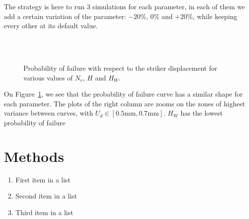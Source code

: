 \documentclass[
10pt, %
a4paper, %
oneside, %
headinclude,footinclude, %
BCOR5mm, %
]{scrartcl}
\begin{document}
The strategy is here to run $3$ simulations for each parameter,
in each of them we add a certain variation of the parameter: $-20\%$, $0\%$ and $+20\%$,
while keeping every other at its default value.

\begin{figure}[H]
    \centering
    \hfill
    \\
    \hfill
    \\
    \hfill

    \caption{Probability of failure with respect to the striker displacement for
        various values of $N_r$, $H$ and $H_W$.}
    \label{fig:param-var}
\end{figure}

On Figure~\ref{fig:param-var}, we see that the probability of failure curve
has a similar shape for each parameter. The plots of the right column are zooms
on the zones of highest variance between curves, with $U_d \in [0.5 \text{mm}, 0.7 \text{mm}]$. $H_W$ has the lowest
probability of failure


\section{Methods}

\lipsum[5] %

\begin{enumerate}[noitemsep] %
    \item First item in a list
    \item Second item in a list
    \item Third item in a list
\end{enumerate}
\end{document}
